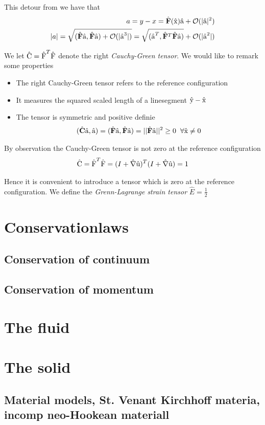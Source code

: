This detour from \cite{Richter2016}  we have that 
\begin{align*}
a = y - x = \hat{F}(\ha{x})\ha{a} +  \mathcal{O}(|\ha{a} |^2) \\
|a| = \sqrt{ (\hat{F}\ha{a},\hat{F}\ha{a})+ \mathcal{O} (|\ha{a}^3|)  } = 
 \sqrt{ (\ha{a}^T, \hat{F}^T\hat{F}\ha{a})} + \mathcal{O} (|\ha{a}^2|)  
\end{align*}

We let $\text{\^{C}} = \text{\^{F}}^T \text{\^{F}}$ denote the right \textit{Cauchy-Green tensor}. We would like to remark some properties

\begin{itemize}
\item The right Cauchy-Green tensor refers to the reference configuration
\item It measures the squared scaled length of a linesegment $\text{\^{y}} - \text{\^{x}}$
\item The tensor is symmetric and positive definie
\begin{align*}
(\hat{C}\ha{a}, \ha{a}) = (\hat{F}\ha{a}, \hat{F}\ha{a}  ) = ||\hat{F} \ha{a} ||^2  \geq 0 \hspace{2mm} \forall \ha{x} \neq 0
\end{align*}
\end{itemize} 

By observation the Cauchy-Green tensor is not zero at the reference configuration 
\begin{align*}
\ha{C} =  \ha{F}^T \ha{F} = (I + \hat{\nabla} \ha{u})^T (I + \hat{\nabla} \ha{u}) = 1
\end{align*}

Hence it is convenient to introduce a tensor which is zero at the reference configuration. We define the \textit{Grenn-Lagrange strain tensor} 
$\hat{E} = \frac{1}{2} $
\section{Conservationlaws}
\subsection{Conservation of continuum}
\subsection{Conservation of momentum}

\section{The fluid}

\section{The solid}

\subsection{Material models, St. Venant Kirchhoff materia, incomp neo-Hookean materiall}


